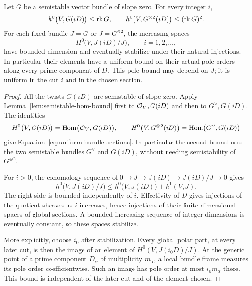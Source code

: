 \begin{proposition}
\label{prop:polar-bounds}
Let $G$ be a semistable vector bundle of slope zero.  For every integer
$i$,
\begin{equation}
  h^0\bigl(V,G(iD)\bigr)\le\operatorname{rk} G,
  \qquad
  h^0\bigl(V,G^{\otimes2}(iD)\bigr)\le(\operatorname{rk} G)^2.
  \label{eq:uniform-bundle-sections}
\end{equation}
For each fixed bundle $J=G$ or $J=G^{\otimes2}$, the increasing spaces
\begin{equation}
  H^0\bigl(V,J(iD)/J\bigr),\qquad i=1,2,\ldots,
  \label{eq:polar-part-system}
\end{equation}
have bounded dimension and eventually stabilize under their natural
injections.  In particular their elements have a uniform bound on their
actual pole orders along every prime component of $D$.  This pole bound
may depend on $J$; it is uniform in the cut $i$ and in the chosen section.
\end{proposition}

\begin{proof}
All the twists $G(iD)$ are semistable of slope zero.  Apply
Lemma~\ref{lem:semistable-hom-bound} first to $\mathcal O_V,G(iD)$ and then to
$G^\vee,G(iD)$.  The identities
\[
  H^0\bigl(V,G(iD)\bigr)=\operatorname{Hom}\bigl(\mathcal O_V,G(iD)\bigr),
  \qquad
  H^0\bigl(V,G^{\otimes2}(iD)\bigr)
    =\operatorname{Hom}\bigl(G^\vee,G(iD)\bigr)
\]
give Equation~\eqref{eq:uniform-bundle-sections}.  In particular the
second bound uses the two semistable bundles $G^\vee$ and $G(iD)$,
without needing semistability of $G^{\otimes2}$.

For $i>0$, the cohomology sequence of
$0\to J\to J(iD)\to J(iD)/J\to0$ gives
\[
  h^0\bigl(V,J(iD)/J\bigr)
  \le h^0\bigl(V,J(iD)\bigr)+h^1(V,J).
\]
The right side is bounded independently of $i$.  Effectivity of $D$
gives injections of the quotient sheaves as $i$ increases, hence
injections of their finite-dimensional spaces of global sections.
A bounded increasing sequence of integer dimensions is eventually
constant, so these spaces stabilize.

More explicitly, choose $i_0$ after stabilization.  Every global polar
part, at every later cut, is then the image of an element of
$H^0(V,J(i_0D)/J)$.  At the generic point of a prime component
$D_\alpha$ of multiplicity $m_\alpha$, a local bundle frame measures its
pole order coefficientwise.  Such an image has pole order at most
$i_0m_\alpha$ there.  This bound is independent of the later cut and of
the element chosen.
\end{proof}

